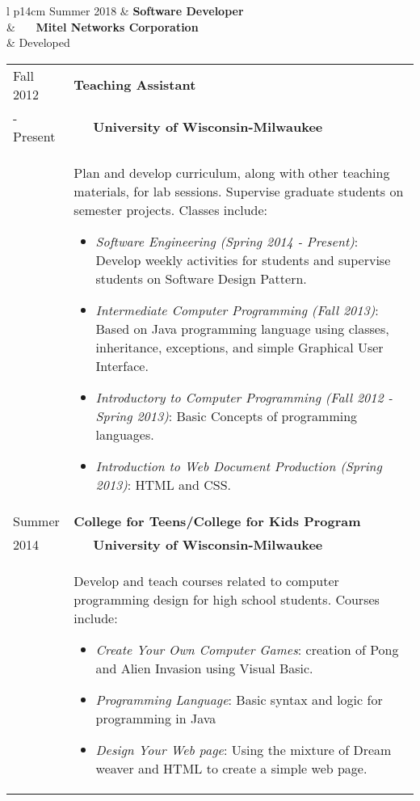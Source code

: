 \documentclass[11pt]{article}
\begin{document}
\noindent \begin{longtable}{l p{14cm}}
	Summer 2018 & \textbf{Software Developer}\\
			  	& ~~~\textbf{Mitel Networks Corporation}\\
			  	&
Developed 

\noindent \begin{longtable}{l p{14cm}}
Fall 2012 & \textbf{Teaching Assistant}\\
- Present & ~~~\textbf{University of Wisconsin-Milwaukee}\\
          &
Plan and develop curriculum, along with other teaching materials, for lab sessions.  Supervise graduate students on semester projects. Classes include:
\vspace{-1em}
\begin{itemize} \itemsep -5pt %
\item {\sl Software Engineering (Spring 2014 - Present)}: Develop weekly activities for students and supervise students on Software Design Pattern.
\item {\sl Intermediate Computer Programming (Fall 2013)}: Based on Java programming language using classes, inheritance, exceptions, and simple Graphical User Interface.
\item {\sl Introductory to Computer Programming (Fall 2012 - Spring 2013)}: Basic Concepts of programming languages.
\item {\sl Introduction to Web Document Production (Spring 2013)}: HTML and CSS. 
\vspace*{-\baselineskip}
\end{itemize}\\

Summer & \textbf{College for Teens/College for Kids Program}\\
2014   & ~~~\textbf{University of Wisconsin-Milwaukee}\\
	   &
Develop and teach courses related to computer programming design for high school students. Courses include:
\vspace{-1em}
\begin{itemize} \itemsep -2pt
        \item {\sl Create Your Own Computer Games}: creation of Pong and Alien Invasion using Visual Basic.
        \item {\sl Programming Language}: Basic syntax and logic for programming in Java
\item {\sl Design Your Web page}: Using the mixture of Dream weaver and HTML to create a simple web page.
\vspace*{-\baselineskip}
\end{itemize} \\


\end{longtable}
\end{longtable}
\end{document}
